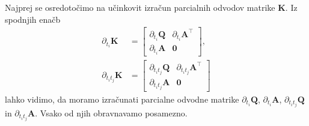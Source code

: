 \documentclass[mat2, tisk]{fmfdelo}
\newcommand{\qmat}{\mathbf{Q}}
\newcommand{\amat}{\mathbf{A}}
\newcommand{\kmat}{\mathbf{K}}
\begin{document}
Najprej se osredotočimo na učinkovit izračun parcialnih odvodov matrike $\kmat$. Iz spodnjih enačb
\begin{equation}
    \begin{aligned}
        \partial_{t_i}\kmat &= \begin{bmatrix}
            \partial_{t_i}\qmat & \partial_{t_i} \amat^{\top} \\
            \partial_{t_i} \amat & \mathbf{0}
        \end{bmatrix}, \\
        \partial_{t_it_j}\kmat &= \begin{bmatrix}
            \partial_{t_it_j}\qmat & \partial_{t_it_j} \amat^{\top} \\
            \partial_{t_it_j} \amat & \mathbf{0}
        \end{bmatrix}
    \end{aligned}
\end{equation}
lahko vidimo, da moramo izračunati parcialne odvodne matrike $\partial_{t_i}\qmat$, $\partial_{t_i} \amat$, $\partial_{t_it_j}\qmat$ in $\partial_{t_it_j} \amat$. Vsako od njih obravnavamo posamezno.
\end{document}

